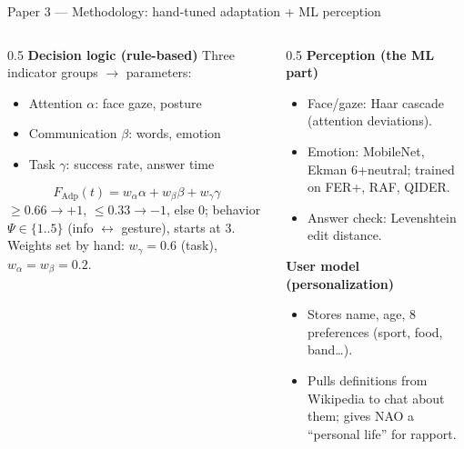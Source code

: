 \documentclass[aspectratio=169,10pt]{beamer}
\begin{document}
\begin{frame}{Paper 3 --- Methodology: hand-tuned adaptation + ML perception}
  \begin{columns}[T]
    \begin{column}{0.5\textwidth}
      \textbf{Decision logic (rule-based)}
      \footnotesize
      Three indicator groups $\rightarrow$ parameters:
      \begin{itemize}\footnotesize
        \item Attention $\alpha$: face gaze, posture
        \item Communication $\beta$: words, emotion
        \item Task $\gamma$: success rate, answer time
      \end{itemize}
      \[ F_{\text{Adp}}(t)=w_\alpha\alpha + w_\beta\beta + w_\gamma\gamma \]
      {\scriptsize $\ge 0.66 \to {+}1$, $\le 0.33 \to {-}1$, else $0$; behavior $\Psi\!\in\!\{1..5\}$ (info $\leftrightarrow$ gesture), starts at 3.}
      {\scriptsize Weights set by hand: $w_\gamma{=}0.6$ (task), $w_\alpha{=}w_\beta{=}0.2$.}
    \end{column}
    \begin{column}{0.5\textwidth}
      \textbf{Perception (the ML part)}
      \begin{itemize}\footnotesize
        \item Face/gaze: \alert{Haar cascade} (attention deviations).
        \item Emotion: \alert{MobileNet}, Ekman 6+neutral; trained on FER+, RAF, QIDER.
        \item Answer check: \alert{Levenshtein} edit distance.
      \end{itemize}
      \textbf{User model (personalization)}
      \begin{itemize}\footnotesize
        \item Stores name, age, 8 preferences (sport, food, band\ldots).
        \item Pulls definitions from \alert{Wikipedia} to chat about them; gives NAO a ``personal life'' for rapport.
      \end{itemize}
    \end{column}
  \end{columns}
\end{frame}
\end{document}
